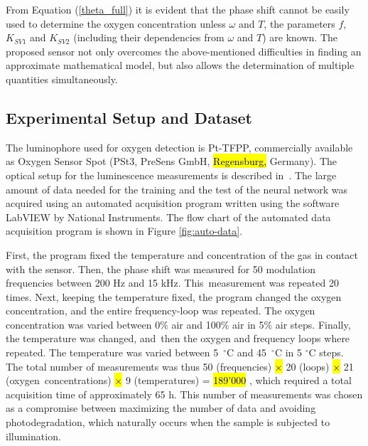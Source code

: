 \documentclass[sensors,article,accept,moreauthors,pdftex,10pt,a4paper]{Definitions/mdpi}
\begin{document}
From Equation (\ref{theta_full}) it is evident that the phase shift cannot be easily used to determine the oxygen concentration unless $\omega$ and $T$, the parameters $f$, $K_{SV1}$ and $K_{SV2}$ (including their dependencies from $\omega$ and $T$) are known.
The proposed sensor not only overcomes the above-mentioned difficulties in finding an approximate mathematical model, but also allows the determination of multiple quantities simultaneously.

\subsection{Experimental Setup and Dataset}
\label{Experimental}

The luminophore used for oxygen detection is Pt-TFPP, commercially available as Oxygen Sensor Spot (PSt3, PreSens  GmbH, \hl{Regensburg,} %
Germany). The optical setup for the luminescence measurements is described in~\cite{Venturini_2020}. 
The large amount of data needed for the training and the test of the neural network was acquired using an automated acquisition program written using the software LabVIEW by National Instruments. The flow chart of the automated data acquisition program is shown in Figure \ref{fig:auto-data}.



First, the program fixed the temperature and concentration of the gas in contact with the sensor. Then, the phase shift was measured for 50 modulation frequencies between 200 Hz and 15 kHz. This~measurement was repeated 20 times. Next, keeping the temperature fixed, the program changed the oxygen concentration, and the entire frequency-loop was repeated.
The oxygen concentration was varied between 0$\%$ air and 100$\%$ air in 5$\%$ air steps.
Finally, the temperature was changed, and~then the oxygen and frequency loops where repeated. The temperature was varied between 5~$^\circ$C and 45~$^\circ$C in 5 $^\circ$C steps.
The total number of measurements was thus 50 (frequencies) \hl{$\times$} 20 (loops) \hl{$\times$} 21 (oxygen~concentrations) \hl{$\times$} %
 9 (temperatures) = \hl{189'000} %
 , which required a total acquisition time of approximately 65 h. This number of measurements was chosen as a compromise between maximizing the number of data and avoiding photodegradation, which naturally occurs when the sample is subjected to illumination. 
\end{document}
